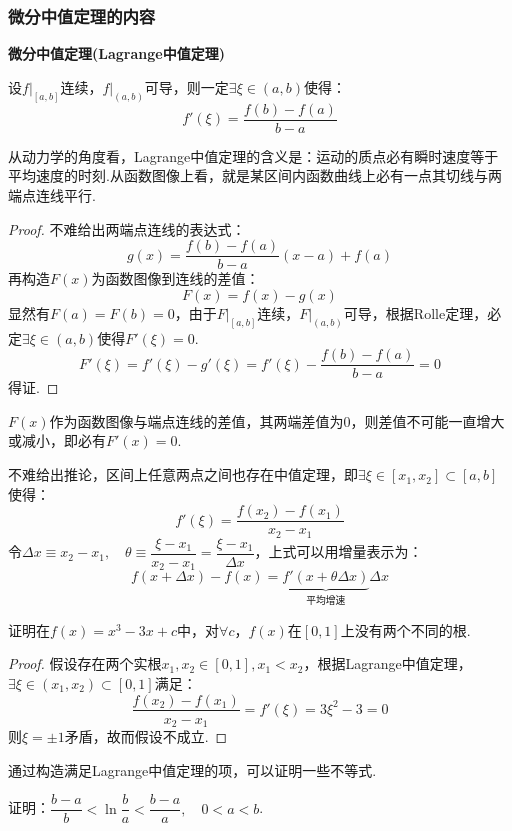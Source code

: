 \subsubsection{微分中值定理的内容}
\begin{theorem}
    \textbf{微分中值定理(Lagrange中值定理)}

    设$\left.f\right|_{[a,b]}$连续，$\left.f\right|_{(a,b)}$可导，则一定$\exists \xi \in (a,b)$使得：
    \[f'(\xi) = \frac{f(b)-f(a)}{b-a}\]
\end{theorem}

从动力学的角度看，Lagrange中值定理的含义是：运动的质点必有瞬时速度等于平均速度的时刻.从函数图像上看，就是某区间内函数曲线上必有一点其切线与两端点连线平行.

\begin{proof}
    不难给出两端点连线的表达式：
    \[g(x) = \frac{f(b)-f(a)}{b-a}(x-a) + f(a)\]
    再构造$F(x)$为函数图像到连线的差值：
    \[F(x) = f(x)-g(x)\]
    显然有$F(a)=F(b)=0$，由于$\left.F\right|_{[a,b]}$连续，$\left.F\right|_{(a,b)}$可导，根据Rolle定理，必定$\exists \xi \in (a,b)$使得$F'(\xi)=0$.
    \[F'(\xi)=f'(\xi)-g'(\xi) = f'(\xi) - \frac{f(b)-f(a)}{b-a} = 0\]
    得证.
\end{proof}
$F(x)$作为函数图像与端点连线的差值，其两端差值为$0$，则差值不可能一直增大或减小，即必有$F'(x)=0$.

不难给出推论，区间上任意两点之间也存在中值定理，即$\exists \xi \in [x_1,x_2] \subset [a,b]$使得：
\[f'(\xi) = \frac{f(x_2)-f(x_1)}{x_2-x_1}\]
令$\Delta x \equiv x_2-x_1,\quad \theta \equiv \dfrac{\xi-x_1}{x_2-x_1} = \dfrac{\xi-x_1}{\Delta x}$，上式可以用增量表示为：
\[f(x+\Delta x) - f(x) = \underbrace{f'(x+\theta\Delta x)}_\text{平均增速}\Delta x\]

\begin{question}
    证明在$f(x)=x^3-3x+c$中，对$\forall c$，$f(x)$在$[0,1]$上没有两个不同的根.
\end{question}

\begin{proof}
    假设存在两个实根$x_1,x_2 \in [0,1],x_1<x_2$，根据Lagrange中值定理，$\exists \xi \in (x_1,x_2) \subset [0,1]$满足：
    \[\frac{f(x_2)-f(x_1)}{x_2-x_1} = f'(\xi) = 3\xi^2-3 = 0\]
    则$\xi = \pm 1$矛盾，故而假设不成立.
\end{proof}


通过构造满足Lagrange中值定理的项，可以证明一些不等式.
\begin{question}
    证明：$\dfrac{b-a}{b} < \ln\dfrac{b}{a} < \dfrac{b-a}{a},\quad 0<a<b$.
\end{question}

